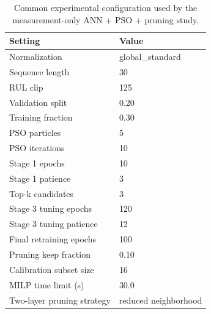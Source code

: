 \begin{table}[H]
    \centering
    \caption{Common experimental configuration used by the measurement-only ANN + PSO + pruning study.}
    \label{tab:experiment_config}
    \begin{tabular}{ll}
        \toprule
        \textbf{Setting} & \textbf{Value} \\
        \midrule
        Normalization & global\_standard \\
        Sequence length & 30 \\
        RUL clip & 125 \\
        Validation split & 0.20 \\
        Training fraction & 0.30 \\
        PSO particles & 5 \\
        PSO iterations & 10 \\
        Stage 1 epochs & 10 \\
        Stage 1 patience & 3 \\
        Top-k candidates & 3 \\
        Stage 3 tuning epochs & 120 \\
        Stage 3 tuning patience & 12 \\
        Final retraining epochs & 100 \\
        Pruning keep fraction & 0.10 \\
        Calibration subset size & 16 \\
        MILP time limit (s) & 30.0 \\
        Two-layer pruning strategy & reduced neighborhood \\
        \bottomrule
    \end{tabular}
\end{table}
